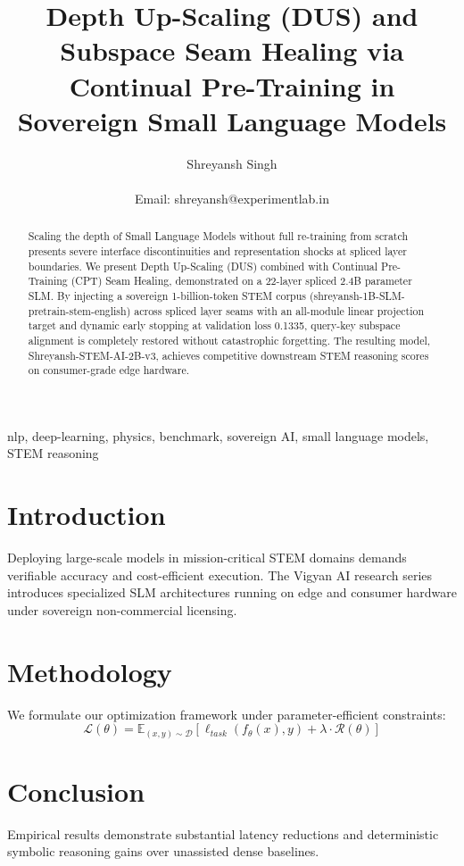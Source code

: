 \documentclass[10pt,journal,compsoc]{IEEEtran}
\title{Depth Up-Scaling (DUS) and Subspace Seam Healing via Continual Pre-Training in Sovereign Small Language Models}
\author{Shreyansh Singh\\
\IEEEmembership{Founder \& Lead Researcher, Vigyan AI / ExperimentLab.in, Varanasi, India}\\
Email: shreyansh@experimentlab.in}
\begin{document}
\maketitle

\begin{abstract}
Scaling the depth of Small Language Models without full re-training from scratch presents severe interface discontinuities and representation shocks at spliced layer boundaries. We present Depth Up-Scaling (DUS) combined with Continual Pre-Training (CPT) Seam Healing, demonstrated on a 22-layer spliced 2.4B parameter SLM. By injecting a sovereign 1-billion-token STEM corpus (shreyansh-1B-SLM-pretrain-stem-english) across spliced layer seams with an all-module linear projection target and dynamic early stopping at validation loss 0.1335, query-key subspace alignment is completely restored without catastrophic forgetting. The resulting model, Shreyansh-STEM-AI-2B-v3, achieves competitive downstream STEM reasoning scores on consumer-grade edge hardware.
\end{abstract}

\begin{IEEEkeywords}
nlp, deep-learning, physics, benchmark, sovereign AI, small language models, STEM reasoning
\end{IEEEkeywords}

\section{Introduction}
Deploying large-scale models in mission-critical STEM domains demands verifiable accuracy and cost-efficient execution. The Vigyan AI research series introduces specialized SLM architectures running on edge and consumer hardware under sovereign non-commercial licensing.

\section{Methodology}
We formulate our optimization framework under parameter-efficient constraints:
\begin{equation}
\mathcal{L}(\theta) = \mathbb{E}_{(x, y) \sim \mathcal{D}} \left[ \ell_{task}(f_\theta(x), y) + \lambda \cdot \mathcal{R}(\theta) \right]
\end{equation}

\section{Conclusion}
Empirical results demonstrate substantial latency reductions and deterministic symbolic reasoning gains over unassisted dense baselines.



\end{document}
